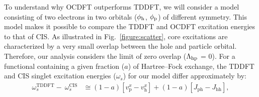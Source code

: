 \documentclass[12pt]{article}
\begin{document}
To understand why OCDFT outperforms TDDFT, we will consider a model consisting of two electrons in two orbitals ($\phi_{\rm h}$, $\phi_{\rm p}$) of different symmetry.\cite{casida_charge-transfer_2000,ziegler_implementation_2012,evangelista_orthogonality_2013}
This model makes it possible to compare the TDDFT and OCDFT excitation energies to that of CIS.
As illustrated in Fig.~\ref{figure:scatter}, core excitations are characterized by a very small overlap between the hole and particle orbital.
Therefore, our analysis considers the limit of zero overlap ($\Lambda_{\rm hp}$ = 0).
For a functional containing a given fraction ($a$) of Hartree--Fock exchange, the TDDFT and CIS singlet excitation energies ($\omega_s$) for our model differ approximately by:
\begin{align}
\label{eq:TDDFT_CIS}
\omega^{\text{TDDFT}}_s - \ \omega^{\text{CIS}}_s &\cong
(1 - a) [v_{\text{p}}^x - v_{\text{h}}^x] +  (1 - a) [J_{\text{ph}} - J_{\text{hh}}]  ,
\end{align}
\end{document}
